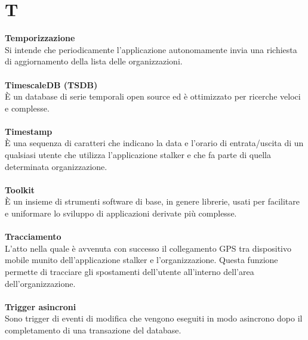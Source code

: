 \section{T}
\textbf{Temporizzazione}\\
Si intende che periodicamente l'applicazione autonomamente invia una richiesta di aggiornamento della lista delle organizzazioni. \\ \\
\textbf{TimescaleDB (TSDB)}\\
È un database di serie temporali open source ed è ottimizzato per ricerche veloci e complesse. \\ \\
\textbf{Timestamp}\\
È una sequenza di caratteri che indicano la data e l'orario di entrata/uscita di un qualsiasi utente che utilizza l'applicazione stalker e che fa parte di quella determinata organizzazione. \\ \\
\textbf{Toolkit}\\
È un insieme di strumenti software di base, in genere librerie, usati per facilitare e uniformare lo sviluppo di applicazioni derivate più complesse. \\ \\
\textbf{Tracciamento}\\ 
L'atto nella quale è avvenuta con successo il collegamento GPS tra dispositivo mobile munito dell'applicazione stalker e l'organizzazione. Questa funzione permette di tracciare gli spostamenti dell'utente all'interno dell'area dell'organizzazione. \\ \\
\textbf{Trigger asincroni}\\
Sono trigger di eventi di modifica che vengono eseguiti in modo asincrono dopo il completamento di una transazione del database. \\ \\
\clearpage
